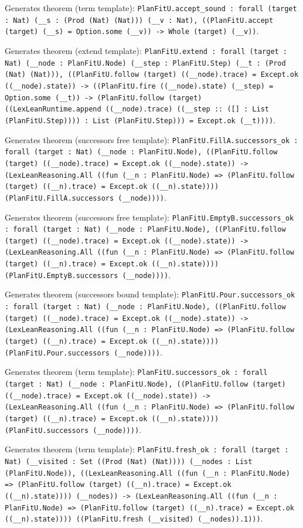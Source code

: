 \documentclass[11pt]{article}
\begin{document}
\noindent Generates theorem (term template): \texttt{PlanFitU.accept\_sound : forall (target : Nat) (\_\_s : (Prod (Nat) (Nat))) (\_\_v : Nat), ((PlanFitU.accept (target) (\_\_s) = Option.some (\_\_v)) -> Whole (target) (\_\_v))}.\par
\noindent Generates theorem (extend template): \texttt{PlanFitU.extend : forall (target : Nat) (\_\_node : PlanFitU.Node) (\_\_step : PlanFitU.Step) (\_\_t : (Prod (Nat) (Nat))), ((PlanFitU.follow (target) ((\_\_node).trace) = Except.ok ((\_\_node).state)) -> ((PlanFitU.fire ((\_\_node).state) (\_\_step) = Option.some (\_\_t)) -> (PlanFitU.follow (target) ((LexLeanRuntime.append ((\_\_node).trace) ((\_\_step :: ([] : List (PlanFitU.Step)))) : List (PlanFitU.Step))) = Except.ok (\_\_t))))}.\par
\noindent Generates theorem (successors free template): \texttt{PlanFitU.FillA.successors\_ok : forall (target : Nat) (\_\_node : PlanFitU.Node), ((PlanFitU.follow (target) ((\_\_node).trace) = Except.ok ((\_\_node).state)) -> (LexLeanReasoning.All ((fun (\_\_n : PlanFitU.Node) => (PlanFitU.follow (target) ((\_\_n).trace) = Except.ok ((\_\_n).state)))) (PlanFitU.FillA.successors (\_\_node))))}.\par
\noindent Generates theorem (successors free template): \texttt{PlanFitU.EmptyB.successors\_ok : forall (target : Nat) (\_\_node : PlanFitU.Node), ((PlanFitU.follow (target) ((\_\_node).trace) = Except.ok ((\_\_node).state)) -> (LexLeanReasoning.All ((fun (\_\_n : PlanFitU.Node) => (PlanFitU.follow (target) ((\_\_n).trace) = Except.ok ((\_\_n).state)))) (PlanFitU.EmptyB.successors (\_\_node))))}.\par
\noindent Generates theorem (successors bound template): \texttt{PlanFitU.Pour.successors\_ok : forall (target : Nat) (\_\_node : PlanFitU.Node), ((PlanFitU.follow (target) ((\_\_node).trace) = Except.ok ((\_\_node).state)) -> (LexLeanReasoning.All ((fun (\_\_n : PlanFitU.Node) => (PlanFitU.follow (target) ((\_\_n).trace) = Except.ok ((\_\_n).state)))) (PlanFitU.Pour.successors (\_\_node))))}.\par
\noindent Generates theorem (term template): \texttt{PlanFitU.successors\_ok : forall (target : Nat) (\_\_node : PlanFitU.Node), ((PlanFitU.follow (target) ((\_\_node).trace) = Except.ok ((\_\_node).state)) -> (LexLeanReasoning.All ((fun (\_\_n : PlanFitU.Node) => (PlanFitU.follow (target) ((\_\_n).trace) = Except.ok ((\_\_n).state)))) (PlanFitU.successors (\_\_node))))}.\par
\noindent Generates theorem (term template): \texttt{PlanFitU.fresh\_ok : forall (target : Nat) (\_\_visited : Set ((Prod (Nat) (Nat)))) (\_\_nodes : List (PlanFitU.Node)), ((LexLeanReasoning.All ((fun (\_\_n : PlanFitU.Node) => (PlanFitU.follow (target) ((\_\_n).trace) = Except.ok ((\_\_n).state)))) (\_\_nodes)) -> (LexLeanReasoning.All ((fun (\_\_n : PlanFitU.Node) => (PlanFitU.follow (target) ((\_\_n).trace) = Except.ok ((\_\_n).state)))) ((PlanFitU.fresh (\_\_visited) (\_\_nodes)).1)))}.\par
\end{document}
